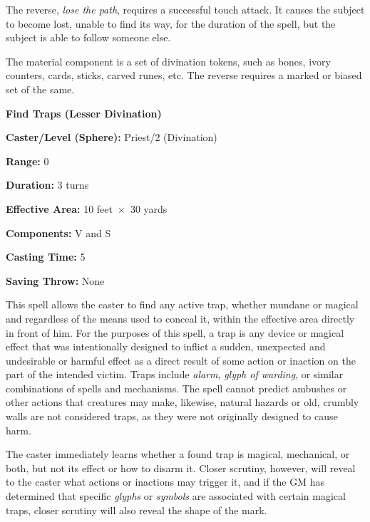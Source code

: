 \begin{multicols}{2}
The reverse, \textit{lose the path}, requires a successful touch attack.  It causes the subject to become lost, unable to find its way, for the duration of the spell, but the subject is able to follow someone else.

The material component is a set of divination tokens, such as bones, ivory counters, cards, sticks, carved runes, etc.  The reverse requires a marked or biased set of the same.

\vspace{1em}

\noindent
\begin{minipage}{\columnwidth}

\noindent \textbf{Find Traps (Lesser Divination)}

\noindent \textbf{Caster/Level (Sphere):} Priest/2 (Divination)

\noindent \textbf{Range:} 0

\noindent \textbf{Duration:} 3 turns

\noindent \textbf{Effective Area:} 10 feet~$\times$~30 yards

\noindent \textbf{Components:} V and S

\noindent \textbf{Casting Time:} 5

\noindent \textbf{Saving Throw:} None

\end{minipage}

This spell allows the caster to find any active trap, whether mundane or magical and regardless of the means used to conceal it, within the effective area directly in front of him.  For the purposes of this spell, a trap is any device or magical effect that was intentionally designed to inflict a sudden, unexpected and undesirable or harmful effect as a direct result of some action or inaction on the part of the intended victim.  Traps include \textit{alarm}, \textit{glyph of warding}, or similar combinations of spells and mechanisms.  The spell cannot predict ambushes or other actions that creatures may make, likewise, natural hazards or old, crumbly walls are not considered traps, as they were not originally designed to cause harm. 

The caster immediately learns whether a found trap is magical, mechanical, or both, but not its effect or how to disarm it.  Closer scrutiny, however, will reveal to the caster what actions or inactions may trigger it, and if the GM has determined that specific \textit{glyphs} or \textit{symbols} are associated with certain magical traps, closer scrutiny will also reveal the shape of the mark. 


\end{multicols}
